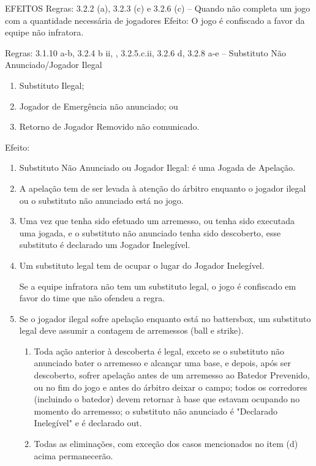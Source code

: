  EFEITOS
 Regras: 3.2.2 (a), 3.2.3 (c) e 3.2.6 (c) -- Quando não completa um jogo com a quantidade necessária de jogadores
 Efeito: O jogo é confiscado a favor da equipe não infratora.

 Regras: 3.1.10 a-b, 3.2.4 b ii, , 3.2.5.c.ii, 3.2.6 d, 3.2.8 a-e -- Substituto Não Anunciado/Jogador Ilegal
	\begin{enumerate}[label=(\alph*)]\item   Substituto Ilegal;
	\item  Jogador de Emergência não anunciado; ou
	\item  Retorno de Jogador Removido não comunicado.
	\end{enumerate}
 Efeito:
\begin{enumerate}[label=(\alph*)]
	\item Substituto Não Anunciado ou Jogador Ilegal: é uma Jogada de Apelação.
 	\item A apelação tem de ser levada à atenção do árbitro enquanto o jogador ilegal ou o substituto não anunciado está no jogo.
	\item Uma vez que tenha sido efetuado um arremesso, ou tenha sido executada uma jogada, e o substituto não anunciado tenha sido descoberto, esse substituto é declarado um Jogador Inelegível.
	\item Um substituto legal tem de ocupar o lugar do Jogador Inelegível.

 Se a equipe infratora não tem um substituto legal, o jogo é confiscado em favor do time que não ofendeu a regra.

	\item Se o jogador ilegal sofre apelação enquanto está no \gls{battersbox}, um substituto legal deve assumir a contagem de arremessos (\gls{ball} e \gls{strike}).

	\begin{enumerate}[label=\roman*.]
		\item Toda ação anterior à descoberta é legal, exceto se o substituto não anunciado bater o arremesso e alcançar uma base, e depois, após ser descoberto, sofrer apelação antes de um arremesso ao Batedor Prevenido, ou no fim do jogo e antes do árbitro deixar o campo; todos os corredores (incluindo o batedor) devem retornar à base que estavam ocupando no momento do arremesso; o substituto não anunciado é "Declarado Inelegível" e é declarado \gls{out}.
		\item Todas as eliminações, com exceção dos casos mencionados no item (d) acima permanecerão.
	\end{enumerate}


\end{enumerate}
